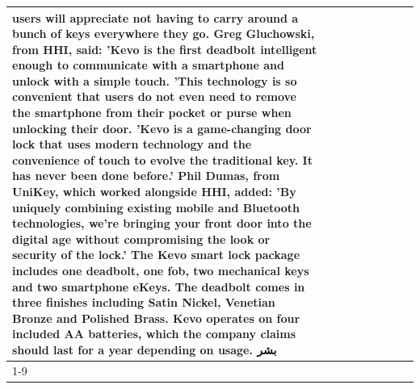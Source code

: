 \begin{table}[H]
\begin{tabular}{lllrlllll}
users will appreciate not having to carry around a bunch of keys everywhere they go. Greg Gluchowski, from HHI, said: 'Kevo is the first deadbolt intelligent enough to communicate with a smartphone and unlock with a simple touch. 'This technology is so convenient that users do not even need to remove the smartphone from their pocket or purse when unlocking their door. 'Kevo is a game-changing door lock that uses modern technology and the convenience of touch to evolve the traditional key. It has never been done before.' Phil Dumas, from UniKey, which worked alongside HHI, added: 'By uniquely combining existing mobile and Bluetooth technologies, we’re bringing your front door into the digital age without compromising the look or security of the lock.' The Kevo smart lock package includes one deadbolt, one fob, two mechanical keys and two smartphone eKeys. The deadbolt comes in three finishes including Satin Nickel, Venetian Bronze and Polished Brass. Kevo operates on four included AA batteries, which the company claims should last for a year depending on usage. بشر \\
\cline{1-9}

\end{tabular}
\end{table}
